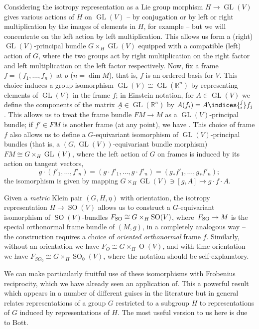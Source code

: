 \documentclass[pdftex]{sigma}
\numberwithin{equation}{section}
\newcommand{\RR}{\mathbb{R}}
\newcommand{\1}{\mathbbm{1}}
\DeclareMathOperator{\GL}{GL}
\DeclareMathOperator{\Orth}{O}
\DeclareMathOperator{\SO}{SO}
\begin{document}
Considering the isotropy representation as a Lie group morphism $H\to\GL(V)$ gives various actions of $H$ on $\GL(V)$ -- by conjugation or by left or right multiplication by the images of elements in $H$, for example -- but we will concentrate on the left action by left multiplication. This allows us form a (right) $\GL(V)$-principal bundle $G\times_H \GL(V)$ equipped with a compatible (left) action of $G$, where the two groups act by right multiplication on the right factor and left multiplication on the left factor respectively. Now, fix a frame $f=(f_1,\dots,f_n)$ at $o$ ($n=\dim M$), that is, $f$ is an ordered basis for $V$. This choice induces a group isomorphism $\GL(V)\cong\GL(\RR^n)$ by representing elements of $\GL(V)$ in the frame $f$; in Einstein notation, for $A\in\GL(V)$ we define the components of the matrix $\underline{A}\in \GL(\RR^n)$ by $A(f_i)=A\indices{^j_i}f_j$. This allows us to treat the frame bundle $FM\to M$ as a $\GL(V)$-principal bundle; if $f'\in FM$ is another frame (at any point), we have
.
This choice of frame $f$ also allows us to define a $G$-equivariant isomorphism of $\GL(V)$-principal bundles (that is, a $(G,\GL(V))$-equivariant bundle morphism)
$FM \cong G\times_H \GL(V)$,
where the left action of $G$ on frames is induced by its action on tangent vectors,
\[%
	g\cdot (f'_1,\dots,f'_n) = (g\cdot f'_1,\dots,g\cdot f'_n) = (g_*f'_1,\dots,g_*f'_n);
\]
the isomorphism is given by mapping $G\times_H \GL(V)\ni [g,A]\mapsto g\cdot f \cdot A$.

Given a \emph{metric} Klein pair $(G,H,\eta)$ with orientation, the isotropy representation $H\to\SO(V)$ allows us to construct a $G$-equivariant isomorphism of $\SO(V)$-bundles
$F_{\rm SO} \cong G\times_H \SO(V)$,
where~${F_{\rm SO}\to M}$ is the special orthonormal frame bundle of $(M,g)$, in a completely analogous way -- the construction requires a choice of \emph{oriented orthonormal} frame $f$. Similarly, without an orientation we have $F_O\cong G\times_H\Orth(V)$, and with time orientation we have $F_{SO_0}\cong G\times_H\SO_0(V)$, where the notation should be self-explanatory.

We can make particularly fruitful use of these isomorphisms with Frobenius reciprocity, which we have already seen an application of. This a powerful result which appears in a number of different guises in the literature but in general relates representations of a group $G$ restricted to a subgroup $H$ to representations of $G$ induced by representations of $H$. The most useful version to us here is due to Bott.
\end{document}
